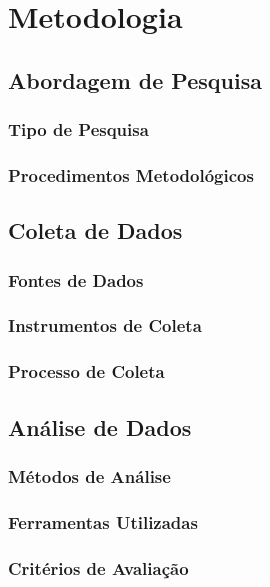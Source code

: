 

\newcommand{\sla}{\textbackslash}

\newcommand{\cmd}[1]{\textsf{#1}}

\newcommand{\pkg}[1]{\textsf{#1}}

\newcommand{\ltxcmd}[1]{\cmd{\sla{}#1}}

\chapter{Metodologia}
\label{cap:metodologia}

\section{Abordagem de Pesquisa}
\subsection{Tipo de Pesquisa}
\subsection{Procedimentos Metodológicos}

\section{Coleta de Dados}
\subsection{Fontes de Dados}
\subsection{Instrumentos de Coleta}
\subsection{Processo de Coleta}

\section{Análise de Dados}
\subsection{Métodos de Análise}
\subsection{Ferramentas Utilizadas}
\subsection{Critérios de Avaliação}
